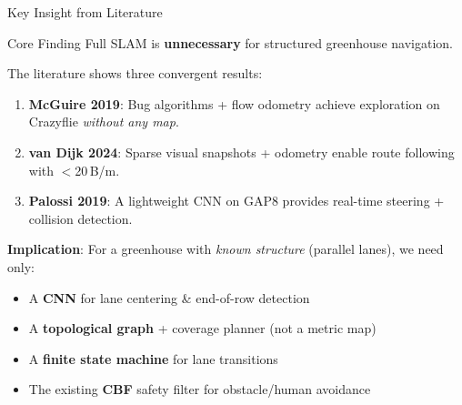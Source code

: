 \documentclass[aspectratio=169, 10pt]{beamer}
\begin{document}
\begin{frame}{Key Insight from Literature}
\begin{alertblock}{Core Finding}
Full SLAM is \textbf{unnecessary} for structured greenhouse navigation.
\end{alertblock}

\vspace{0.5em}
The literature shows three convergent results:
\begin{enumerate}
  \item \textbf{McGuire 2019}: Bug algorithms + flow odometry achieve exploration on Crazyflie \emph{without any map}.
  \item \textbf{van Dijk 2024}: Sparse visual snapshots + odometry enable route following with $<$20\,B/m.
  \item \textbf{Palossi 2019}: A lightweight CNN on GAP8 provides real-time steering + collision detection.
\end{enumerate}

\vspace{0.5em}
\textbf{Implication}: For a greenhouse with \emph{known structure} (parallel lanes), we need only:
\begin{itemize}
  \item A \textcolor{cnnblue}{\textbf{CNN}} for lane centering \& end-of-row detection
  \item A \textcolor{cbfgreen}{\textbf{topological graph}} + coverage planner (not a metric map)
  \item A \textbf{finite state machine} for lane transitions
  \item The existing \textcolor{warnorange}{\textbf{CBF}} safety filter for obstacle/human avoidance
\end{itemize}
\end{frame}
\end{document}
